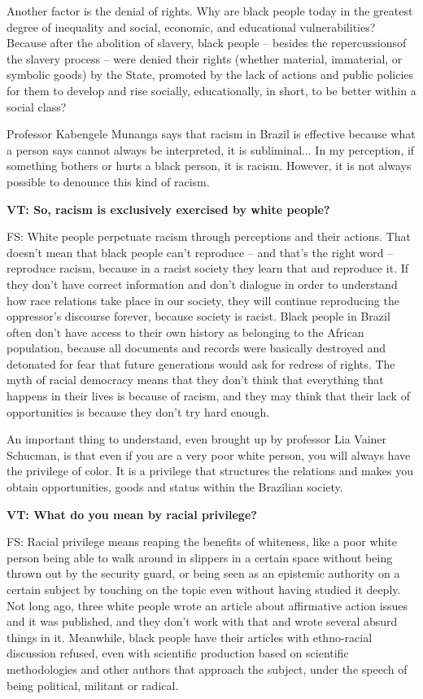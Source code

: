 \documentclass[a4paper,
fontsize=11pt,
oneside,
numbers=noperiodatend,
parskip=half-,
bibliography=totoc,
final
]{scrartcl}
\begin{document}
Another factor is the denial of rights. Why are black people today in
the greatest degree of inequality and social, economic, and educational
vulnerabilities? Because after the abolition of slavery, black people --
besides the repercussionsof the slavery process -- were denied their
rights (whether material, immaterial, or symbolic goods) by the State,
promoted by the lack of actions and public policies for them to develop
and rise socially, educationally, in short, to be better within a social
class?

Professor Kabengele Munanga says that racism in Brazil is effective
because what a person says cannot always be interpreted, it is
subliminal... In my perception, if something bothers or hurts a black
person, it is racism. However, it is not always possible to denounce
this kind of racism.

\textbf{VT: So, racism is exclusively exercised by white people?}

FS: White people perpetuate racism through perceptions and their
actions. That doesn't mean that black people can't reproduce -- and
that's the right word -- reproduce racism, because in a racist society
they learn that and reproduce it. If they don't have correct information
and don't dialogue in order to understand how race relations take place
in our society, they will continue reproducing the oppressor's discourse
forever, because society is racist. Black people in Brazil often don't
have access to their own history as belonging to the African population,
because all documents and records were basically destroyed and detonated
for fear that future generations would ask for redress of rights. The
myth of racial democracy means that they don't think that everything
that happens in their lives is because of racism, and they may think
that their lack of opportunities is because they don't try hard enough.

An important thing to understand, even brought up by professor Lia
Vainer Schucman, is that even if you are a very poor white person, you
will always have the privilege of color. It is a privilege that
structures the relations and makes you obtain opportunities, goods and
status within the Brazilian society.

\textbf{VT: What do you mean by racial privilege?}

FS: Racial privilege means reaping the benefits of whiteness, like a
poor white person being able to walk around in slippers in a certain
space without being thrown out by the security guard, or being seen as
an epistemic authority on a certain subject by touching on the topic
even without having studied it deeply. Not long ago, three white people
wrote an article about affirmative action issues and it was published,
and they don't work with that and wrote several absurd things in it.
Meanwhile, black people have their articles with ethno-racial discussion
refused, even with scientific production based on scientific
methodologies and other authors that approach the subject, under the
speech of being political, militant or radical.
\end{document}
